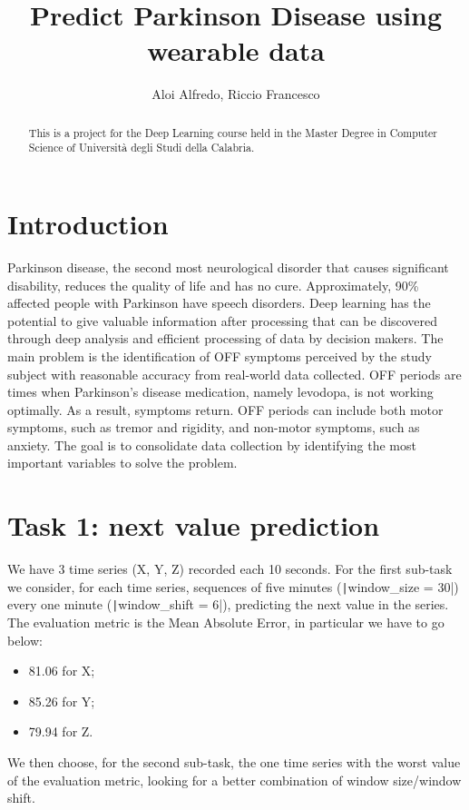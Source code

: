 \documentclass[12pt,a4paper,leqno]{article}
\title{Predict Parkinson Disease using wearable data}
\author{Aloi Alfredo, Riccio Francesco}
\begin{document}
	
	\maketitle
	
	\begin{abstract}
		This is a project for the Deep Learning course held in the Master Degree in Computer Science of Università degli Studi della Calabria.
	\end{abstract}

	\newpage

	\tableofcontents

	\newpage
	
	\section{Introduction}
	Parkinson disease, the second most neurological disorder that causes significant disability, reduces the quality of life and has no cure. Approximately, 90\% affected people with Parkinson have speech disorders. Deep learning has the potential to give valuable information after processing that can be discovered through deep analysis and efficient processing of data by decision makers. The main problem is the identification of OFF symptoms perceived by the study subject with reasonable accuracy from real-world data collected. OFF periods are times when Parkinson’s disease medication, namely levodopa, is not working optimally. As a result, symptoms return. OFF periods can include both motor symptoms, such as tremor and rigidity, and non-motor symptoms, such as anxiety. The goal is to consolidate data collection by identifying the most important variables to solve the problem.
		
	\newpage
	
	\section{Task 1: next value prediction}
	We have 3 time series (X, Y, Z) recorded each 10 seconds. For the first sub-task we consider, for each time series, sequences of five minutes (\texttt|window_size = 30|) every one minute (\texttt|window_shift = 6|), predicting the next value in the series. The evaluation metric is the Mean Absolute Error, in particular we have to go below:
	\begin{itemize}
		\item 81.06 for X;
		\item 85.26 for Y;
		\item 79.94 for Z.
	\end{itemize}
	We then choose, for the second sub-task, the one time series with the worst value of the evaluation metric, looking for a better combination of window size/window shift.
	
\end{document}
